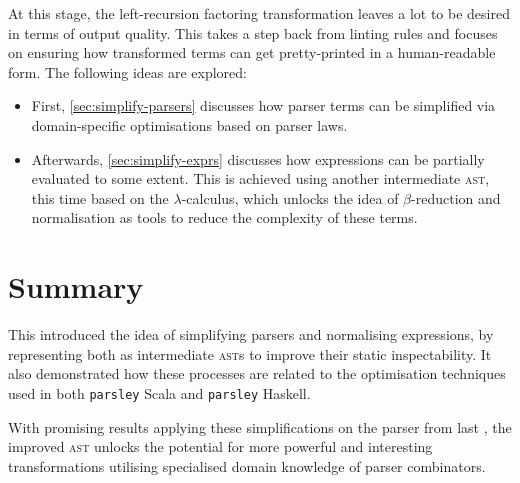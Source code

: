 \documentclass[../../main.tex]{subfiles}
\begin{document}
\label{sec:impl}
At this stage, the left-recursion factoring transformation leaves a lot to be desired in terms of output quality.
This  takes a step back from linting rules and focuses on ensuring how transformed terms can get pretty-printed in a human-readable form.
The following ideas are explored:
\begin{itemize}
  \item First, \cref{sec:simplify-parsers} discusses how parser terms can be simplified via domain-specific optimisations based on parser laws.
  \item Afterwards, \cref{sec:simplify-exprs} discusses how expressions can be partially evaluated to some extent. This is achieved using another intermediate \textsc{ast}, this time based on the $\lambda$-calculus, which unlocks the idea of $\beta$-reduction and normalisation as tools to reduce the complexity of these terms.
\end{itemize}








\section*{Summary}
This  introduced the idea of simplifying parsers and normalising expressions, by representing both as intermediate \textsc{ast}s to improve their static inspectability.
It also demonstrated how these processes are related to the optimisation techniques used in both \texttt{parsley} Scala and \texttt{parsley} Haskell.

With promising results applying these simplifications on the  parser from last , the improved  \textsc{ast} unlocks the potential for more powerful and interesting transformations utilising specialised domain knowledge of parser combinators.
\end{document}
